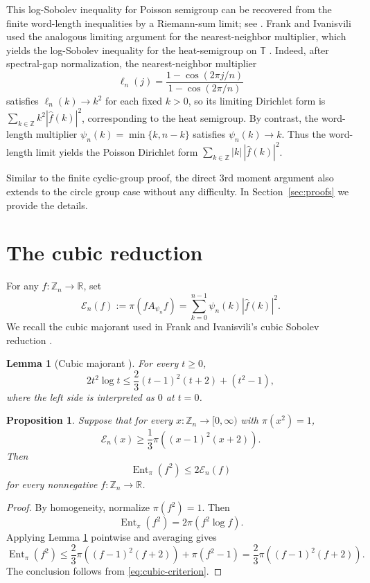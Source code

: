 \documentclass[11pt]{amsart}
\numberwithin{equation}{section}
\theoremstyle{plain}
\newtheorem{lemma}[theorem]{Lemma}
\newtheorem{proposition}[theorem]{Proposition}
\theoremstyle{remark}
\newcommand{\ZZ}{\mathbb Z}
\newcommand{\RR}{\mathbb R}
\newcommand{\Zn}[1]{\mathbb Z_{#1}}
\newcommand{\wh}[1]{\widehat{#1}}
\newcommand{\psin}{\psi_n}
\newcommand{\Apsi}{A_{\psin}}
\newcommand{\TT}{\mathbb T}
\newcommand{\AvgSymbol}{\pi}
\newcommand{\Avg}[1]{\AvgSymbol\!\left(#1\right)}
\newcommand{\EntMeasure}{\pi}
\newcommand{\Ent}[1]{\operatorname{Ent}_{\EntMeasure}\!\left(#1\right)}
\newcommand{\Energy}{\mathcal E}
\newcommand{\En}{\Energy_n}
\newcommand{\abs}[1]{\left|#1\right|}
\begin{document}
This log-Sobolev inequality for Poisson semigroup can be recovered from the finite word-length
inequalities by a Riemann-sum limit; see
\cite{Yao2026}.  Frank and Ivanisvili used the analogous
limiting argument for the nearest-neighbor multiplier, which yields the log-Sobolev inequality for the 
heat-semigroup on \(\TT\) \cite{FrankIvanisvili2026}.
Indeed, after spectral-gap normalization, the nearest-neighbor multiplier
\[
  \ell_n(j)=\frac{1-\cos(2\pi j/n)}{1-\cos(2\pi/n)}
\]
satisfies \(\ell_n(k)\to k^2\) for each fixed \(k>0\), so its
limiting Dirichlet form is \(\sum_{k\in\ZZ}k^2\abs{\wh f(k)}^2\), corresponding
to the heat semigroup.  By contrast, the word-length multiplier
\(\psin(k)=\min\{k,n-k\}\) satisfies \(\psin(k)\to k\).   Thus the word-length limit yields the Poisson
Dirichlet form \(\sum_{k\in\ZZ}\abs{k}\,\abs{\wh f(k)}^2\).

Similar to the finite cyclic-group proof, the direct 3rd moment argument also
extends to the circle group case without any difficulty.  In
Section~\ref{sec:proofs} we provide the details. 

\section{The cubic reduction}



For any \(f:\Zn{n}\to \RR\), set
\[
  \En(f):=\Avg{f\Apsi f}
  =\sum_{k=0}^{n-1}\psin(k)\abs{\wh f(k)}^2.\]
We recall the cubic majorant used in
Frank and Ivanisvili's cubic Sobolev reduction \cite{FrankIvanisvili2026}.

\begin{lemma}[Cubic majorant {\cite{FrankIvanisvili2026}}]\label{lem:cubic-majorant}
For every \(t\ge0\),
\[
  2t^2\log t
  \le
  \frac23(t-1)^2(t+2)+(t^2-1),
\]
where the left side is interpreted as \(0\) at \(t=0\).
\end{lemma}

\begin{proposition}\label{prop:cubic-criterion}
Suppose that for every \(x:\Zn{n}\to[0,\infty)\) with \(\Avg{x^2}=1\),
\begin{equation}\label{eq:cubic-criterion}
  \En(x)\ge \frac13\Avg{(x-1)^2(x+2)}.
\end{equation}
Then
\[
  \Ent{f^2}\le 2\En(f)
\]
for every nonnegative \(f:\Zn{n}\to\RR\).
\end{proposition}

\begin{proof}
By homogeneity, normalize \(\Avg{f^2}=1\).  Then
\[
  \Ent{f^2}=2\Avg{f^2\log f}.
\]
Applying Lemma \ref{lem:cubic-majorant} pointwise and averaging gives
\[
  \Ent{f^2}
  \le \frac23\Avg{(f-1)^2(f+2)}
  +\Avg{f^2-1}
  =\frac23\Avg{(f-1)^2(f+2)}.
\]
The conclusion follows from \eqref{eq:cubic-criterion}.
\end{proof}
\end{document}
